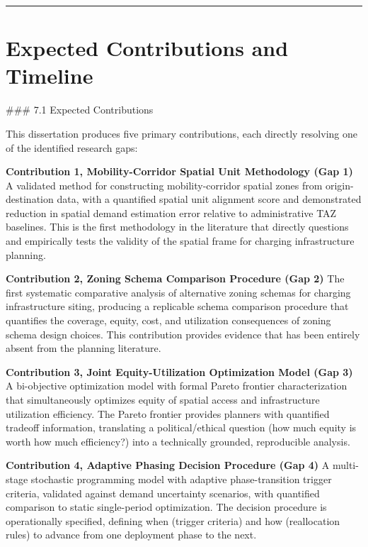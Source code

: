 \documentclass[letterpaper, 12pt, oneside, doublespacing]{Thesis}
\begin{document}
\bigskip\noindent\rule{\linewidth}{0.4pt}\bigskip


\iffalse %
\chapter{Expected Contributions and Timeline}

\#\#\# 7.1 Expected Contributions

This dissertation produces five primary contributions, each directly resolving one of the identified research gaps:

\textbf{Contribution 1, Mobility-Corridor Spatial Unit Methodology (Gap 1)}
A validated method for constructing mobility-corridor spatial zones from origin-destination data, with a quantified spatial unit alignment score and demonstrated reduction in spatial demand estimation error relative to administrative TAZ baselines. This is the first methodology in the literature that directly questions and empirically tests the validity of the spatial frame for charging infrastructure planning.

\textbf{Contribution 2, Zoning Schema Comparison Procedure (Gap 2)}
The first systematic comparative analysis of alternative zoning schemas for charging infrastructure siting, producing a replicable schema comparison procedure that quantifies the coverage, equity, cost, and utilization consequences of zoning schema design choices. This contribution provides evidence that has been entirely absent from the planning literature.

\textbf{Contribution 3, Joint Equity-Utilization Optimization Model (Gap 3)}
A bi-objective optimization model with formal Pareto frontier characterization that simultaneously optimizes equity of spatial access and infrastructure utilization efficiency. The Pareto frontier provides planners with quantified tradeoff information, translating a political/ethical question (how much equity is worth how much efficiency?) into a technically grounded, reproducible analysis.

\textbf{Contribution 4, Adaptive Phasing Decision Procedure (Gap 4)}
A multi-stage stochastic programming model with adaptive phase-transition trigger criteria, validated against demand uncertainty scenarios, with quantified comparison to static single-period optimization. The decision procedure is operationally specified, defining when (trigger criteria) and how (reallocation rules) to advance from one deployment phase to the next.
\end{document}
